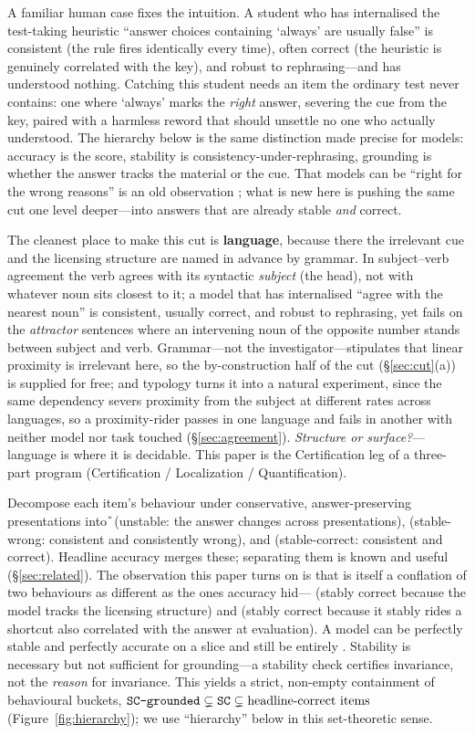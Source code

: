 A familiar human case fixes the intuition. A student who has internalised the
test-taking heuristic ``answer choices containing `always' are usually false''
is consistent (the rule fires identically every time), often
correct (the heuristic is genuinely correlated with the key), and
robust to rephrasing---and has understood nothing. Catching this student
needs an item the ordinary test never contains: one where `always' marks the
\emph{right} answer, severing the cue from the key, paired with a harmless
reword that should unsettle no one who actually understood. The hierarchy below
is the same distinction made precise for models: accuracy is the
score, stability is consistency-under-rephrasing, grounding is
whether the answer tracks the material or the cue. That models can be ``right
for the wrong reasons'' is an old observation \citep{mccoy2019right}; what is new
here is pushing the same cut one level deeper---into answers that are already
stable \emph{and} correct.

The cleanest place to make this cut is \textbf{language}, because there the
irrelevant cue and the licensing structure are named in advance by grammar. In
subject--verb agreement the verb agrees with its syntactic \emph{subject} (the
head), not with whatever noun sits closest to it; a model that has internalised
``agree with the nearest noun'' is consistent, usually correct, and robust to
rephrasing, yet fails on the \emph{attractor} sentences where an intervening noun
of the opposite number stands between subject and verb. Grammar---not the
investigator---stipulates that linear proximity is irrelevant here, so the
by-construction half of the cut (\S\ref{sec:cut}(a)) is supplied for free; and
typology turns it into a natural experiment, since the same dependency severs
proximity from the subject at different rates across languages, so a
proximity-rider passes in one language and fails in another with neither model
nor task touched (\S\ref{sec:agreement}). \emph{Structure or surface?}---language
is where it is decidable. This paper is the Certification leg of a three-part
program (Certification / Localization / Quantification).

Decompose each item's behaviour under conservative, answer-preserving
presentations into \U{} (unstable: the answer changes across presentations),
\SW{} (stable-wrong: consistent and consistently wrong), and \SC{}
(stable-correct: consistent and correct). Headline accuracy merges these;
separating them is known and useful (\S\ref{sec:related}). The observation
this paper turns on is that \SC{} is itself a conflation of two behaviours
as different as the ones accuracy hid---\scg{} (stably correct
because the model tracks the licensing structure) and \scs{} (stably correct
because it stably rides a shortcut also correlated with the answer at
evaluation). A model can be perfectly stable and perfectly accurate on a slice
and still be entirely \scs{}. Stability is necessary but not sufficient
for grounding---a stability check certifies invariance, not the \emph{reason}
for invariance. This yields a strict, non-empty containment of behavioural
buckets, $\texttt{SC-grounded}{} \subsetneq \texttt{SC}{} \subsetneq \text{headline-correct items}$
(Figure~\ref{fig:hierarchy}); we use ``hierarchy'' below in this set-theoretic
sense.

